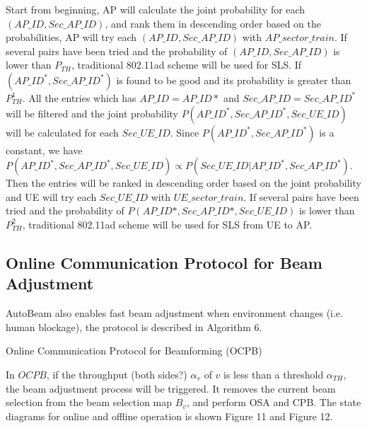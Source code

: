 \documentclass[conference]{IEEEtran}
\begin{document}
Start from beginning, AP will calculate the joint probability for each $(AP\_ID,Sec\_AP\_ID)$, and rank them in descending order based on the probabilities, AP will try each $(AP\_ID,Sec\_AP\_ID)$ with $AP\_sector\_train$. If several pairs have been tried and the probability of $(AP\_ID,Sec\_AP\_ID)$ is lower than $P_{TH}$, traditional 802.11ad scheme will be used for SLS. If $(AP\_ID^{*},Sec\_AP\_ID^{*})$ is found to be good and its probability is greater than $P^{1}_{TH}$. All the entries which has $AP\_ID=AP\_ID*$ and $Sec\_AP\_ID=Sec\_AP\_ID^{*}$ will be filtered and the joint probability $P(AP\_ID^{*},Sec\_AP\_ID^{*},Sec\_UE\_ID)$ will be calculated for each $Sec\_UE\_ID$. Since $P(AP\_ID^{*},Sec\_AP\_ID^{*})$ is a constant, we have $P(AP\_ID^{*},Sec\_AP\_ID^{*},Sec\_UE\_ID)\propto P(Sec\_UE\_ID|AP\_ID^{*},Sec\_AP\_ID^{*})$. Then the entries will be ranked in descending order based on the joint probability and UE will try each $Sec\_UE\_ID$ with $UE\_sector\_train$.  If several pairs have been tried and the probability of $P(AP\_ID*,Sec\_AP\_ID*,Sec\_UE\_ID)$ is lower than $P^{2}_{TH}$, traditional 802.11ad scheme will be used for SLS from UE to AP.  
\subsection{Online Communication Protocol for Beam Adjustment}
AutoBeam also enables fast beam adjustment when environment changes (i.e. human blockage), the protocol is described in Algorithm 6.
\begin{algorithm}[H]	
	\caption{Online Communication Protocol for Beamforming (OCPB)}
\end{algorithm}
In $OCPB$, if the throughput (both sides?) $\alpha_{v}$  of $v$ is less than a threshold $\alpha_{TH}$, the beam adjustment process will be triggered. It removes the current beam selection from the beam selection map $B_{v}$, and perform OSA and CPB. The state diagrams for online and offline operation is shown Figure 11 and Figure 12.
\end{document}
